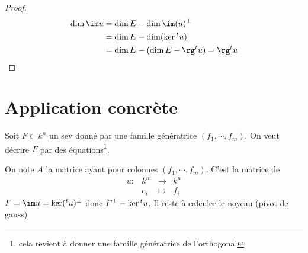\begin{proof}
\begin{align*}
    \dim \im u &= \dim E - \dim \im(u)^\bot \\&= \dim E - \dim (\ker \transpose u)\\ &= \dim E - (\dim E - \rg \transpose u)=\rg\transpose u
\end{align*}
\end{proof}

\section{Application concrète}

Soit $F\subset k^n$ un sev donné par une famille génératrice  $(f_1, \cdots , f_m)$. On veut décrire $F$ par des équations\footnote{cela revient à donner une famille génératrice de l'orthogonal}.

On note $A$ la matrice ayant pour colonnes  $(f_1, \cdots , f_m)$. C'est la matrice de  \[
\begin{array}{rrcl}
    u:& k^m  & \longrightarrow & k^n \\
    & e_i & \longmapsto & \displaystyle f_i
\end{array}
\] 
$F = \im u=\ker(\transpose u)^\bot$ donc  $F^\bot-\ker{}^t u$. Il reste à calculer le noyeau (pivot de gauss)
